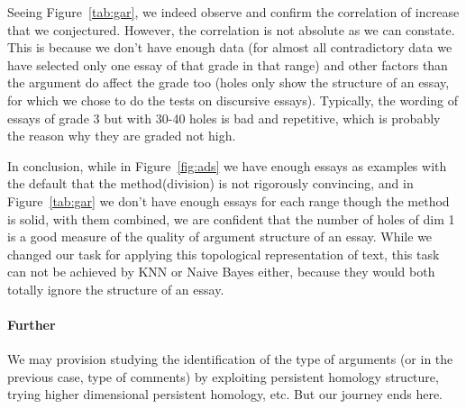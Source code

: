 

Seeing Figure~\ref{tab:gar}, we indeed observe and confirm the correlation of increase
that we conjectured. However, the correlation is not absolute as we can constate.
This is because we don't have enough data (for almost all contradictory data
we have selected only one essay of that grade in that range) and other factors than the argument
do affect the grade too (holes only show the structure of an essay, for which we
chose to do the tests on discursive essays). Typically, the wording
of essays of grade 3 but with 30-40 holes is bad and repetitive, which is
probably the reason why they are graded not high.

In conclusion, while in Figure~\ref{fig:ads} we have enough essays as examples with the default that
the method(division) is not rigorously convincing, and in Figure~\ref{tab:gar} we don't
have enough essays for each range though the method is solid, with them combined,
we are confident that the number of holes of dim 1 is a good measure of the quality of
argument structure of an essay. While we changed our task for applying
this topological representation of text, this task can not be achieved by
KNN or Naive Bayes either, because they would both totally ignore
the structure of an essay.

\paragraph{Further} We may provision studying the identification of the type
of arguments (or in the previous case, type of comments) by exploiting persistent homology structure,
trying higher dimensional persistent homology, etc. But our journey ends here.